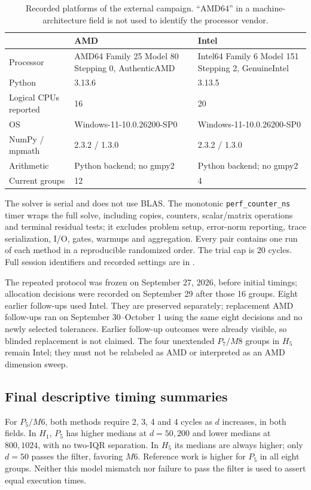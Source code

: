 \documentclass[11pt]{article}
\begin{document}
\begin{table}[htbp]\centering\small
\caption{Recorded platforms of the external campaign. ``AMD64'' in a machine-architecture field is not used to identify the processor vendor.}\label{tab:ext-platforms}
\begin{tabularx}{\textwidth}{lXX}\toprule
 & AMD & Intel\\\midrule
Processor & AMD64 Family 25 Model 80 Stepping 0, AuthenticAMD & Intel64 Family 6 Model 151 Stepping 2, GenuineIntel\\
Python & 3.13.6 & 3.13.5\\
Logical CPUs reported & 16 & 20\\
OS & Windows-11-10.0.26200-SP0 & Windows-11-10.0.26200-SP0\\
NumPy / mpmath & 2.3.2 / 1.3.0 & 2.3.2 / 1.3.0\\
Arithmetic & Python backend; no gmpy2 & Python backend; no gmpy2\\
Current groups & 12 & 4\\\bottomrule
\end{tabularx}\end{table}
\FloatBarrier

The solver is serial and does not use BLAS. The monotonic \texttt{perf\_counter\_ns} timer wraps the full solve, including copies, counters, scalar/matrix operations and terminal residual tests; it excludes problem setup, error-norm reporting, trace serialization, I/O, gates, warmups and aggregation. Every pair contains one run of each method in a reproducible randomized order. The trial cap is 20 cycles. Full session identifiers and recorded settings are in .

The repeated protocol was frozen on September 27, 2026, before initial timings; allocation decisions were recorded on September 29 after those 16 groups. Eight earlier follow-ups used Intel. They are preserved separately; replacement AMD follow-ups ran on September 30--October 1 using the same eight decisions and no newly selected tolerances. Earlier follow-up outcomes were already visible, so blinded replacement is not claimed. The four unextended $P_7/M8$ groups in $H_5$ remain Intel; they must not be relabeled as AMD or interpreted as an AMD dimension sweep.

\subsection{Final descriptive timing summaries}


For $P_5/M6$, both methods require 2, 3, 4 and 4 cycles as $d$ increases, in both fields. In $H_1$, $P_5$ has higher medians at $d=50,200$ and lower medians at $800,1024$, with no two-IQR separation. In $H_5$ its medians are always higher; only $d=50$ passes the filter, favoring $M6$. Reference work is higher for $P_5$ in all eight groups. Neither this model mismatch nor failure to pass the filter is used to assert equal execution times.
\end{document}
